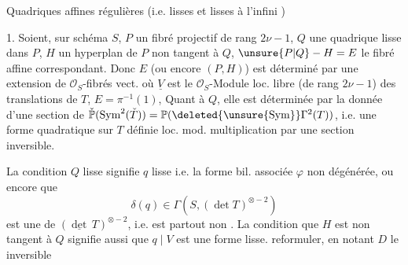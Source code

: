  Quadriques affines régulières (i.e.  lisses et lisses à l'infini )

1. Soient, sur schéma $S$, $P$ un fibré projectif de rang $2\nu-1$, $Q$ une quadrique lisse dans $P$, $H$ un hyperplan de $P$ non tangent à $Q$, $\unsure{P|Q}-H=E$ le fibré affine correspondant. Donc $E$ (ou encore $(P,H)$) est déterminé par une extension de $\mathcal O_S$-fibrés vect.
où $\underline V$ est le $\mathcal O_S$-Module loc. libre (de rang $2\nu-1$) des translations de $T$, $E=\pi^{-1}(1)$,  Quant à $Q$, elle est déterminée par la donnée d'une section de $\check{\mathbb P}(\operatorname{Sym}^2(\check T))=\mathbb P(\deleted{\unsure{\operatorname{Sym}}}\Gamma^2(T))$, i.e. une forme quadratique  sur $T$ définie loc. mod. multiplication par une section inversible.

La condition $Q$ lisse signifie $q$ lisse i.e. la forme bil. associée $\varphi$ non dégénérée, ou encore que
\[
\delta(q)\in\Gamma(S,(\det T)^{\otimes-2})\tag*{(2)}
\]
est une  de $(\underline{\det}\,T)^{\otimes-2}$, i.e. est partout non . La condition que $H$ est non tangent à $Q$ signifie aussi que $q\mid V$ est une forme lisse.  reformuler, en notant $D$ le  inversible

